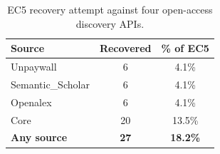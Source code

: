 \begin{table}[htbp]
\centering
\caption{EC5 recovery attempt against four open-access discovery APIs.}
\label{tab:ec5-recovery}
\begin{tabular}{lcc}
\toprule
Source & Recovered & \% of EC5 \\
\midrule
Unpaywall & 6 & 4.1\% \\
Semantic\_Scholar & 6 & 4.1\% \\
Openalex & 6 & 4.1\% \\
Core & 20 & 13.5\% \\
\midrule
\textbf{Any source} & \textbf{27} & \textbf{18.2\%} \\
\bottomrule
\end{tabular}
\end{table}